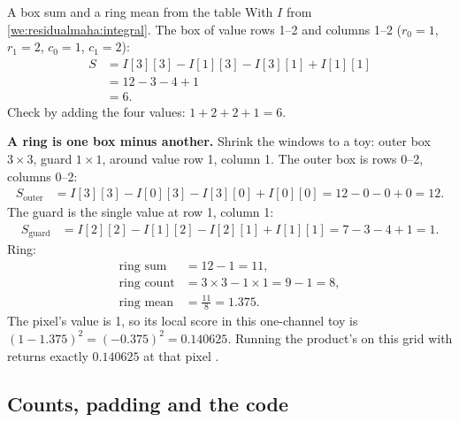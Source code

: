 \begin{worked}[label={we:residualmaha:box}]{A box sum and a ring mean from the table}
With $I$ from \cref{we:residualmaha:integral}. The box of value rows 1--2 and columns 1--2 ($r_0=1$, $r_1=2$,
$c_0=1$, $c_1=2$):
\begin{align*}
S &= I[3][3]-I[1][3]-I[3][1]+I[1][1]\\
&= 12-3-4+1\\
&= 6.
\end{align*}
Check by adding the four values: $1+2+2+1=6$.

\textbf{A ring is one box minus another.} Shrink the windows to a toy: outer box $3\times3$, guard $1\times1$,
around value row 1, column 1. The outer box is rows 0--2, columns 0--2:
\begin{align*}
S_{\text{outer}} &= I[3][3]-I[0][3]-I[3][0]+I[0][0] = 12-0-0+0 = 12.
\end{align*}
The guard is the single value at row 1, column 1:
\begin{align*}
S_{\text{guard}} &= I[2][2]-I[1][2]-I[2][1]+I[1][1] = 7-3-4+1 = 1.
\end{align*}
Ring:
\begin{align*}
\text{ring sum} &= 12-1 = 11,\\
\text{ring count} &= 3\times3-1\times1 = 9-1 = 8,\\
\text{ring mean} &= \frac{11}{8} = 1.375.
\end{align*}
The pixel's value is 1, so its local score in this one-channel toy is $(1-1.375)^2=(-0.375)^2=0.140625$.
Running the product's  on this grid with  returns exactly
$0.140625$ at that pixel \tagC.
\end{worked}

\subsection{Counts, padding and the code}

